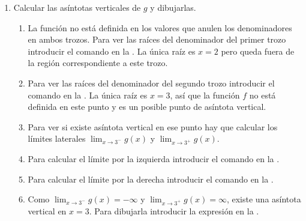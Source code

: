 \begin{enumerate}[leftmargin=*]
\begin{enumerate}
      \item Calcular las asíntotas verticales de $g$ y dibujarlas.
            \begin{indication}
            \begin{enumerate}
            \item La función no está definida en los valores que anulen los denominadores en ambos trozos.
                  Para ver las raíces del denominador del primer trozo introducir el comando  en la .
                  La única raíz es $x=2$ pero queda fuera de la región correspondiente a este trozo.
            \item Para ver las raíces del denominador del segundo trozo introducir el comando  en la .
                  La única raíz es $x=3$, así que la función $f$ no está definida en este punto y es un posible punto de asíntota vertical.
            \item Para ver si existe asíntota vertical en ese punto hay que calcular los límites laterales $\lim_{x\rightarrow 3^-}g(x)$ y $\lim_{x\rightarrow 3^+}g(x)$.
            \item Para calcular el límite por la izquierda introducir el comando  en la .
            \item Para calcular el límite por la derecha introducir el comando  en la .
            \item Como $\lim_{x\rightarrow 3^-}g(x)=-\infty$ y $\lim_{x\rightarrow 3^+}g(x)=\infty$, existe una asíntota vertical en $x=3$.
                  Para dibujarla introducir la expresión  en la .
            \end{enumerate}
            \end{indication}


\end{enumerate}
\end{enumerate}
